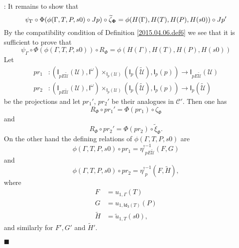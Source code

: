 \documentclass[12pt]{article}
\numberwithin{equation}{section}
\newenvironment{myproof}{{\bf Proof}:}{$\blacksquare$ \vskip 5mm }
\newcommand{\sr}{\rightarrow}
\newcommand{\wt}{\widetilde}
\newcommand{\Idx}{\mathsf{Id_3}} %
\newcommand{\U}{\mathcal{U}}
\newcommand{\I}{\mathsf{I}}
\newcommand{\etashriek}{\eta^!}
\newcommand{\etaunshriek}{{\etashriek}^{-1}}
\begin{document}
\begin{myproof}
It remains to show that
%
$$\psi_{\Gamma}\circ \Phi(\phi(\Gamma,T,P,s0)\circ Jp)\circ
\wt{\zeta}_{\bf\Phi}=\phi(H(\Gamma),H(T),H(P),H(s0))\circ Jp'$$
%
By the compatibility condition of Definition \ref{2015.04.06.def6} we see that
it is sufficient to prove that
%
$$\psi_{\Gamma}\circ \Phi(\phi(\Gamma,T,P,s0))\circ R_{\Phi} =
\phi(H(\Gamma),H(T),H(P),H(s0))$$
%
Let
%
\begin{align*}
  pr_1 & :(\I_{pE\wt{\U}}(\U),\I^{\omega})\times_{\I_{p}(\U)}(\I_{p}(\wt{\U}),\I_p(p))\sr \I_{pE\wt{\U}}(\U) \\
  pr_2 & :(\I_{pE\wt{\U}}(\U),\I^{\omega})\times_{\I_{p}(\U)}(\I_{p}(\wt{\U}),\I_p(p))\sr \I_{p}(\wt{\U})
\end{align*}
%
be the projections and let $pr_1'$, $pr_2'$ be their analogues in $\mathcal
C'$. Then one has
%
$$R_{\Phi}\circ pr_1'=\Phi(pr_1)\circ \zeta_{\Phi}$$
and
$$R_{\Phi}\circ pr_2'=\Phi(pr_2)\circ \wt{\xi}_{\Phi}.$$
%
On the other hand the defining relations of $\phi(\Gamma,T,P,s0)$ are
%
$$\phi(\Gamma,T,P,s0)\circ pr_1=\etaunshriek_{pE\wt{\U}}(F,G)$$
and
$$\phi(\Gamma,T,P,s0)\circ pr_2=\etaunshriek_p(F,\wt{H}),$$
%
where
%
\begin{align*}
  F&=u_{1,\Gamma}(T) \\
  G&=u_{1,\Idx(T)}(P)\\
  \wt{H}&=\wt{u}_{1,T}(s0),
\end{align*}
%
and similarly for $F',G'$ and $\wt{H}'$.


\end{myproof}
\end{document}
